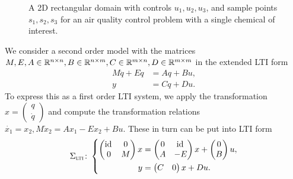 \begin{example}
\begin{figure}[h]
        \caption{A 2D rectangular domain with controls $u_1, u_2, u_3$, and sample points $s_1, s_2, s_3$ for an air quality control problem with a single chemical of interest.}%
        \label{fig:air-quality}
    \end{figure}
\end{example}

\begin{example}\label{ex:casting-second-order}
    We consider a second order model with the matrices $M, E, A \in \mathbb{R}^{n \times n}, B \in \mathbb{R}^{n \times m}, C \in \mathbb{R}^{m \times n}, D \in \mathbb{R}^{m \times m}$ in the extended \ac{LTI} form
    \begin{align*}
        M \ddot{q} + E \dot{q} &= A q + B u, \\
        y &= C q + D u.
    \end{align*}
    To express this as a first order \ac{LTI} system, we apply the transformation $x = \begin{pmatrix}
        q \\
        \dot{q}
    \end{pmatrix}$
    and compute the transformation relations $\dot{x_1} = x_2, M \dot{x}_2 = A x_1 - E x_2 + Bu$.
    These in turn can be put into \ac{LTI} form
    \begin{equation*}
        \Sigma_{\textnormal{\scshape lti}} \colon \left\lbrace
        \begin{aligned}
            \begin{pmatrix}
                \text{id}_{\mkern2mu } & 0 \\
                0 & M
            \end{pmatrix} x &= \begin{pmatrix}
                0 & \text{id}_{\mkern2mu } \\
                A & -E
            \end{pmatrix} x + \begin{pmatrix}
                0 \\
                B
            \end{pmatrix} u, \\
            y &= \begin{pmatrix}
                C & 0
            \end{pmatrix} x + D u.
        \end{aligned}
        \right.
    \end{equation*}
\end{example}

